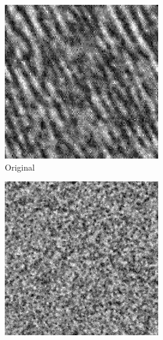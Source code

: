 \documentclass[11pt, oneside]{article}   	%
\begin{document}
\begin{figure}[H]
    \centering
    \begin{subfigure}[b]{0.3\textwidth}
        \includegraphics[width=\textwidth]{fur0}
        \caption{Original}
        \label{fig:fur0}
    \end{subfigure}
    \begin{subfigure}[b]{0.3\textwidth}
        \includegraphics[width=\textwidth]{fur1}

\end{subfigure}
\end{figure}
\end{document}
